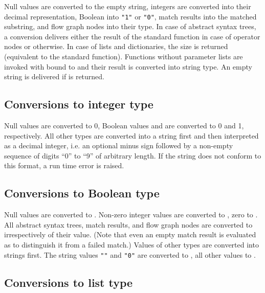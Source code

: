 Null values are converted to the empty string,
integers are converted into their decimal representation,
Boolean into \lstinline!"1"! or \lstinline!"0"!,
match results into the matched substring, and
flow graph nodes into their type. In case of
abstract syntax trees, a conversion delivers either the result of
the standard function  in case of
operator nodes or  otherwise. In case
of lists and dictionaries, the size is returned (equivalent to the
 standard function). Functions without
parameter lists are invoked with
 bound to  and their result is converted
into string type. An empty string is delivered if  is
returned.

\subsection{Conversions to integer type}\label{intconv}

Null values are converted to 0, Boolean values  and
 are converted to 0 and 1, respectively. All other types are
converted into a string first and then interpreted as a decimal integer,
i.e. an optional minus sign followed by a non-empty sequence of digits
``0'' to ``9'' of arbitrary length. If the string does not conform to
this format, a run time error is raised.

\subsection{Conversions to Boolean type}\label{boolconv}

Null values are converted to .
Non-zero integer values are converted to , zero to .
All abstract syntax trees, match results, and flow graph nodes are
converted to  irrespectively of their value. (Note that
even an empty match result is evaluated as  to distinguish
it from a failed match.) Values of other types are converted into
strings first. The string values \lstinline!""! and \lstinline!"0"!
are converted to , all other values to .

\subsection{Conversions to list type}

